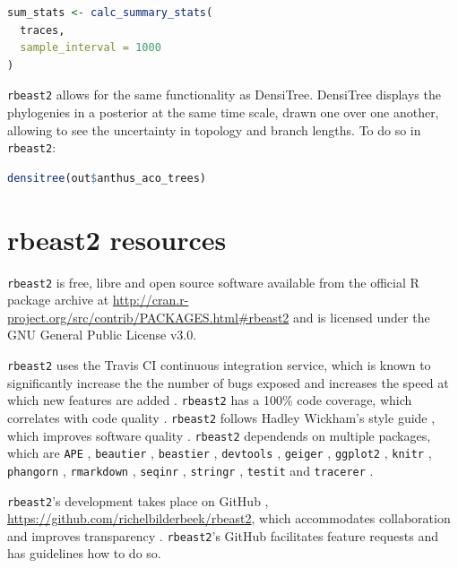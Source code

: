\documentclass{article}
\begin{document}
\begin{lstlisting}[language=R, floatplacement=H]
sum_stats <- calc_summary_stats(
  traces, 
  sample_interval = 1000
)
\end{lstlisting}

\verb;rbeast2; allows for the same functionality as DensiTree.
DensiTree displays the phylogenies in a posterior at the same
time scale, drawn one over one another, allowing to see the uncertainty in
topology and branch lengths. To do so in \verb;rbeast2;:

\begin{lstlisting}[language=R, floatplacement=H]
densitree(out$anthus_aco_trees)
\end{lstlisting}

\section{rbeast2 resources}

\verb;rbeast2; is free, libre and open source software available 
from the official R package archive at 
\url{http://cran.r-project.org/src/contrib/PACKAGES.html\#rbeast2}
and is licensed under the GNU General Public License v3.0.

\verb;rbeast2; uses the Travis CI \cite{travis} 
continuous integration service, which is known to significantly 
increase the the number of bugs exposed \cite{vasilescu2015} and increases
the speed at which new features are added \cite{vasilescu2015}.
\verb;rbeast2; has a 100\% code coverage, which correlates with code quality \cite{horgan1994,del1995correlation}. 
\verb;rbeast2; follows Hadley Wickham's style guide \cite{style_guide}, 
which improves software quality \cite{fang2001}.
\verb;rbeast2; dependends on multiple packages, which are 
\verb;APE; \cite{APE}, 
\verb;beautier; \cite{beautier},
\verb;beastier; \cite{beastier},
\verb;devtools; \cite{devtools},
\verb;geiger; \cite{GEIGER},
\verb;ggplot2; \cite{ggplot2},
\verb;knitr; \cite{knitr},
\verb;phangorn; \cite{phangorn},
\verb;rmarkdown; \cite{rmarkdown},
\verb;seqinr; \cite{seqinr},
\verb;stringr; \cite{stringr},
\verb;testit; \cite{testit} and 
\verb;tracerer; \cite{tracerer}.

\verb;rbeast2;'s development takes place on GitHub \cite{github},
\url{https://github.com/richelbilderbeek/rbeast2}, 
which accommodates collaboration \cite{perez2016ten} 
and improves transparency \cite{gorgolewski2016practical}.
\verb;rbeast2;'s GitHub facilitates feature requests and has guidelines how to do so.
\end{document}
